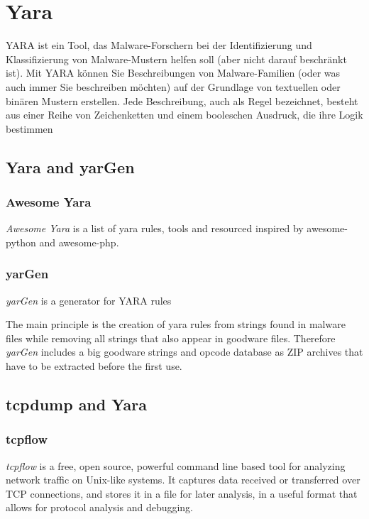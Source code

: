 

\section{Yara}
YARA ist ein Tool, das Malware-Forschern bei der Identifizierung und Klassifizierung von Malware-Mustern helfen soll (aber nicht darauf beschränkt ist). Mit YARA können Sie Beschreibungen von Malware-Familien (oder was auch immer Sie beschreiben möchten) auf der Grundlage von textuellen oder binären Mustern erstellen. Jede Beschreibung, auch als Regel bezeichnet, besteht aus einer Reihe von Zeichenketten und einem booleschen Ausdruck, die ihre Logik bestimmen

\subsection{Yara and yarGen}

\subsubsection{Awesome Yara}
\textit{Awesome Yara} is a list of yara rules, tools and resourced inspired by awesome-python and awesome-php.

\subsubsection{yarGen}
\textit{yarGen} is a generator for YARA rules

The main principle is the creation of yara rules from strings found in malware files while removing all strings that also appear in goodware files. Therefore \textit{yarGen} includes a big goodware strings and opcode database as ZIP archives that have to be extracted before the first use.

\subsection{tcpdump and Yara}

\subsubsection{tcpflow}
\textit{tcpflow} is a free, open source, powerful command line based tool for analyzing network traffic on Unix-like systems. It captures data received or transferred over TCP connections, and stores it in a file for later analysis, in a useful format that allows for protocol analysis and debugging.

